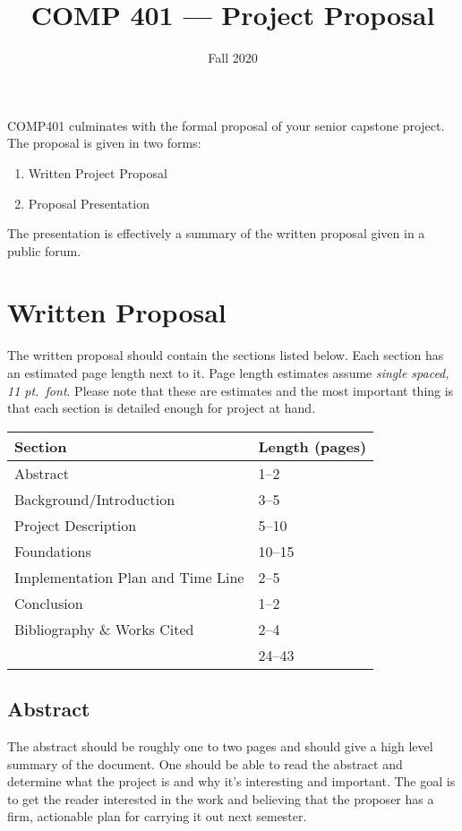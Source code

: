 \documentclass[nobib]{tufte-handout}
\title{COMP 401 --- Project Proposal}
\author{  }
\date{Fall 2020}
\begin{document}
\maketitle

COMP401 culminates with the formal proposal of your senior capstone project.  The proposal is given in two forms:
\begin{enumerate}
\item Written Project Proposal
\item Proposal Presentation
\end{enumerate}
The presentation is effectively a summary of the written proposal given in a public forum.

\section{Written Proposal}

The written proposal should contain the sections listed below.  Each section has an estimated page length next to it.  Page length estimates assume \textit{single spaced, 11 pt.\ font}.  Please note that these are estimates and the most important thing is that each section is detailed enough for project at hand.
\begin{center}
\begin{tabular}{ll}
  Section & Length (pages) \\ \toprule
  Abstract & 1--2 \\
  Background/Introduction  & 3--5 \\
  Project Description  & 5--10 \\
  Foundations & 10--15 \\
  Implementation Plan and Time Line & 2--5 \\
  Conclusion & 1--2 \\
  Bibliography \& Works Cited & 2--4 \\ \midrule
   & 24--43
\end{tabular}
\end{center}

\subsection{Abstract}

The abstract should be roughly one to two pages and should give a high level summary of the document.  One should be able to read the abstract and determine what the project is and why it's interesting and important.  The goal is to get the reader interested in the work and believing that the proposer has a firm, actionable plan for carrying it out next semester.
\end{document}
